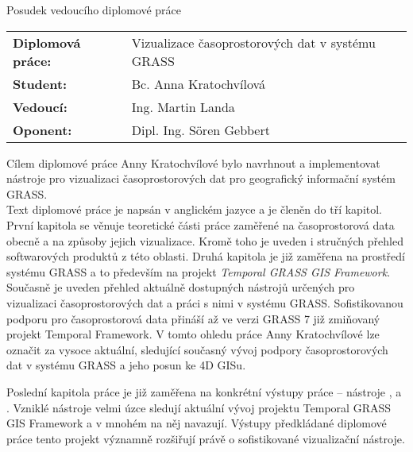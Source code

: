 \documentclass[czech,11pt,a4paper]{article}
\begin{document}
\begin{center}
  {\Large Posudek vedoucího diplomové práce}
\end{center}

\vspace{.5cm}

\noindent \begin{tabular}{lp{}}
  {\bf Diplomová práce:} &
  Vizualizace časoprostorových dat v systému GRASS \\
  {\bf Student:} & Bc. Anna Kratochvílová \\
  {\bf Vedoucí:} & Ing. Martin Landa \\
  {\bf Oponent:} & Dipl. Ing. S\"oren Gebbert \\
\end{tabular}

\vspace{1cm}

Cílem diplomové práce Anny Kratochvílové bylo navrhnout a
implementovat nástroje pro vizualizaci časoprostorových dat
pro geografický informační systém GRASS. \\

Text diplomové práce je napsán v anglickém jazyce a je členěn do tří
kapitol. První kapitola se věnuje teoretické části práce zaměřené na
časoprostorová data obecně a na způsoby jejich vizualizace. Kromě toho
je uveden i stručných přehled softwarových produktů z této
oblasti. Druhá kapitola je již zaměřena na prostředí systému GRASS a
to především na projekt {\em Temporal GRASS GIS Framework}. Současně
je uveden přehled aktuálně dostupných nástrojů určených pro
vizualizaci časoprostorových dat a práci s nimi v systému
GRASS. Sofistikovanou podporu pro časoprostorová data přináší až ve
verzi GRASS 7 již zmiňovaný projekt Temporal Framework. V tomto ohledu
práce Anny Kratochvílové lze označit za vysoce aktuální, sledující
současný vývoj podpory časoprostorových dat v systému GRASS a jeho
posun ke 4D GISu.

Poslední kapitola práce je již zaměřena na konkrétní výstupy práce --
nástroje ,  a . Vzniklé nástroje velmi úzce sledují aktuální vývoj projektu
Temporal GRASS GIS Framework a v mnohém na něj navazují. Výstupy
předkládané diplomové práce tento projekt významně rozšiřují právě o
sofistikované vizualizační nástroje. \\
\end{document}

